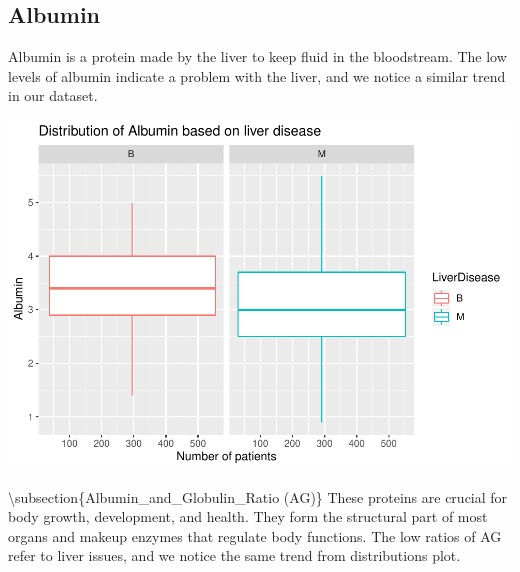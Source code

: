 \documentclass[]{article}
\newenvironment{Shaded}{\begin{snugshade}}{\end{snugshade}}
\newcommand{\CommentTok}[1]{\textcolor[rgb]{0.56,0.35,0.01}{\textit{#1}}}
\newcommand{\DataTypeTok}[1]{\textcolor[rgb]{0.13,0.29,0.53}{#1}}
\newcommand{\KeywordTok}[1]{\textcolor[rgb]{0.13,0.29,0.53}{\textbf{#1}}}
\newcommand{\NormalTok}[1]{#1}
\newcommand{\OperatorTok}[1]{\textcolor[rgb]{0.81,0.36,0.00}{\textbf{#1}}}
\newcommand{\StringTok}[1]{\textcolor[rgb]{0.31,0.60,0.02}{#1}}
\begin{document}
\subsection{Albumin}

Albumin is a protein made by the liver to keep fluid in the bloodstream.
The low levels of albumin indicate a problem with the liver, and we
notice a similar trend in our dataset.

\begin{Shaded}
\end{Shaded}

\includegraphics{LiverDisease_files/figure-latex/unnamed-chunk-22-1.pdf}

\textbackslash subsection\{Albumin\_and\_Globulin\_Ratio (AG)\} These
proteins are crucial for body growth, development, and health. They form
the structural part of most organs and makeup enzymes that regulate body
functions. The low ratios of AG refer to liver issues, and we notice the
same trend from distributions plot.
\end{document}
